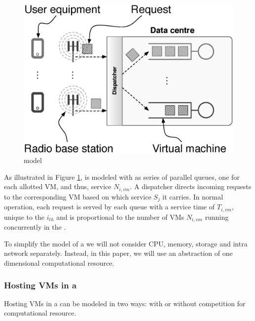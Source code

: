 \subsection{\Dc}
\begin{figure}[tb]
	\centering
	\includegraphics[width=\linewidth]{fig_dc_model.eps} 
	\caption{\Dc{} model}
	\label{fig:dc_model}
\end{figure}

As illustrated in Figure \ref{fig:dc_model}, \dc{} is modeled with as series of parallel queues, one for each allotted VM, and thus, service $N_{i,vm}$. 
A dispatcher directs incoming requests to the corresponding VM based on which service $S_j$ it carries. 
In normal operation, each request is served by each queue with a service time of $T_{i,vm}$, unique to the $i_{th}$ \dc{} and is proportional to the number of VMs $N_{i,vm}$ running concurrently in the \dc{}.

To simplify the model of a \dc{} we will not consider CPU, memory, storage and intra \dc{} network separately.
Instead, in this paper, we will use an abstraction of one dimensional computational resource.

\subsubsection{Hosting VMs in a \dc{}}
Hosting VMs in a \dc{} can be modeled in two ways: with or without competition for computational resource.

